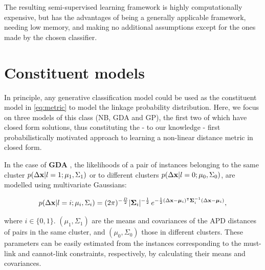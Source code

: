 \documentclass[12pt,PhD,twoside]{muthesis}
\begin{document}
The resulting semi-supervised learning framework is highly computationally expensive, but has the advantages of being a generally applicable framework, needing low memory, and making no additional assumptions except for the ones made by the chosen classifier.

\section*{Constituent models}


In principle, any generative classification model could be used as the constituent model in \eqref{eq:metric} to model the linkage probability distribution. Here, we focus on three models of this class (NB, GDA and GP), the first two of which have closed form solutions, thus constituting the - to our knowledge - first probabilistically motivated approach to learning a non-linear distance metric in closed form.


In the case of \textbf{GDA} \citep{bensmail1996regularized}, the likelihoods of a pair of instances belonging to the same cluster $p( \Delta \textbf x | l=1; \mu_1, \Sigma_1)$ or to different clusters $p( \Delta \textbf x | l=0; \mu_0, \Sigma_0) $, are modelled using multivariate Gaussians:

\begin{equation}
\label{eq:gda}
p( \Delta \textbf x | l=i; \mu_i, \Sigma_i) = (2\pi)^{-\frac{D}{2}}|\boldsymbol\Sigma_i|^{-\frac{1}{2}}\, e^{ -\frac{1}{2}(\Delta \mathbf{x}-\boldsymbol\mu_i)^\intercal\boldsymbol\Sigma_i^{-1}(\Delta \mathbf{x}-\boldsymbol\mu_i) },
\end{equation}

where $i \in \{0,1\}$. $(\mu_1, \Sigma_1)$ are the means and covariances of the APD distances of pairs in the same cluster, and $(\mu_0, \Sigma_0)$ those in different clusters. These parameters can be easily estimated from the instances corresponding to the must-link and cannot-link constraints, respectively, by calculating their means and covariances. 
\end{document}
